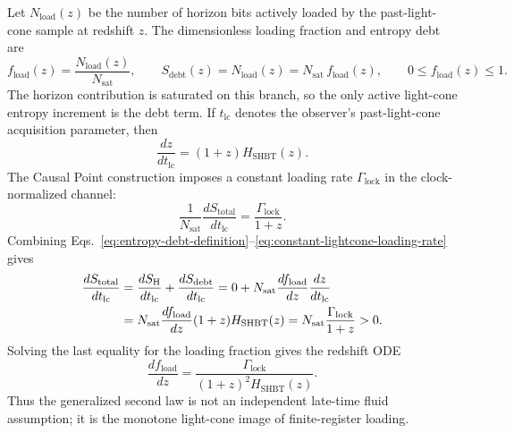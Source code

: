 \documentclass[11pt,letterpaper]{article}
\theoremstyle{plain}
\newcommand{\Nsat}{N_{\text{sat}}}
\newcommand{\fload}{f_{\text{load}}}
\newcommand{\debtentropy}{S_{\text{debt}}}
\newcommand{\horizonentropy}{S_{\text{H}}}
\newcommand{\GammaLock}{\Gamma_{\text{lock}}}
\begin{document}
Let \(N_{\text{load}}(z)\) be the number of horizon bits actively loaded by the
past-light-cone sample at redshift \(z\).  The dimensionless loading fraction
and entropy debt are
\begin{equation}
\label{eq:entropy-debt-definition}
 \fload(z)=\frac{N_{\text{load}}(z)}{\Nsat},
 \qquad
 \debtentropy(z)=N_{\text{load}}(z)=\Nsat\,\fload(z),
 \qquad
 0\le\fload(z)\le1.
\end{equation}
The horizon contribution is saturated on this branch, so the only active
light-cone entropy increment is the debt term.  If
\(t_{\text{lc}}\) denotes the observer's past-light-cone acquisition parameter,
then
\begin{equation}
\label{eq:past-light-cone-redshift-rate}
 \frac{dz}{dt_{\text{lc}}}
 =
 (1+z)H_{\text{SHBT}}(z).
\end{equation}
The Causal Point construction imposes a constant loading rate \(\GammaLock\)
in the clock-normalized channel:
\begin{equation}
\label{eq:constant-lightcone-loading-rate}
 \frac{1}{\Nsat}\frac{dS_{\text{total}}}{dt_{\text{lc}}}
 =
 \frac{\GammaLock}{1+z}.
\end{equation}
Combining Eqs.~\eqref{eq:entropy-debt-definition}--\eqref{eq:constant-lightcone-loading-rate}
gives
\begin{align}
\label{eq:gsl-cosmology}
 \frac{dS_{\text{total}}}{dt_{\text{lc}}}
 &=
 \frac{d\horizonentropy}{dt_{\text{lc}}}
 +
 \frac{dS_{\text{debt}}}{dt_{\text{lc}}}
 =
 0+
 \Nsat
 \frac{d\fload}{dz}
 \frac{dz}{dt_{\text{lc}}}
 \notag\\
 &=
 \Nsat
 \frac{d\fload}{dz}
 (1+z)H_{\text{SHBT}}(z)
 =
 \Nsat\frac{\GammaLock}{1+z}
 >0.
\end{align}
Solving the last equality for the loading fraction gives the redshift ODE
\begin{equation}
\label{eq:entropy-debt-loading-law}
 \boxed{
 \frac{d\fload}{dz}
 =
 \frac{\GammaLock}
 {(1+z)^2H_{\text{SHBT}}(z)}.
 }
\end{equation}
Thus the generalized second law is not an independent late-time fluid
assumption; it is the monotone light-cone image of finite-register loading.
\end{document}
